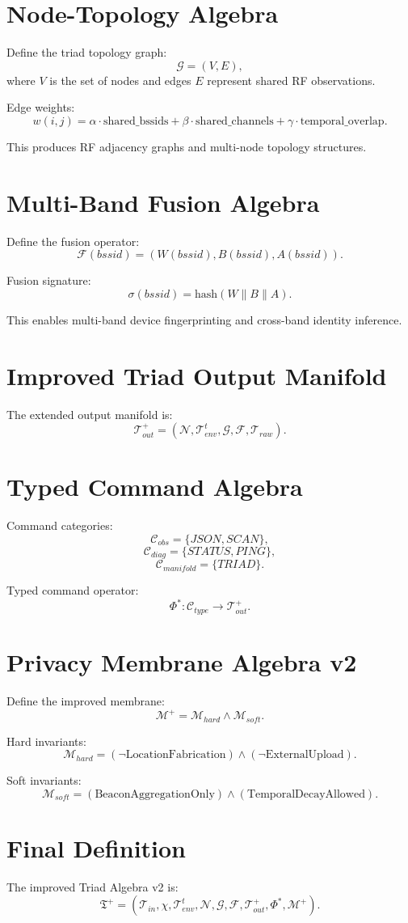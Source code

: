 \documentclass[11pt]{article}
\begin{document}
\section{Node-Topology Algebra}
Define the triad topology graph:
\[
\mathcal{G} = (V,E),
\]
where $V$ is the set of nodes and edges $E$ represent shared RF observations.

Edge weights:
\[
w(i,j)
= \alpha \cdot \text{shared\_bssids}
+ \beta \cdot \text{shared\_channels}
+ \gamma \cdot \text{temporal\_overlap}.
\]

This produces RF adjacency graphs and multi-node topology structures.

\section{Multi-Band Fusion Algebra}
Define the fusion operator:
\[
\mathcal{F}(bssid) = (W(bssid), B(bssid), A(bssid)).
\]

Fusion signature:
\[
\sigma(bssid) = \mathrm{hash}(W \parallel B \parallel A).
\]

This enables multi-band device fingerprinting and cross-band identity inference.

\section{Improved Triad Output Manifold}
The extended output manifold is:
\[
\mathcal{T}_{out}^{+}
= (\mathcal{N},\mathcal{T}_{env}^{t},\mathcal{G},\mathcal{F},\mathcal{T}_{raw}).
\]

\section{Typed Command Algebra}
Command categories:
\[
\mathcal{C}_{obs} = \{JSON, SCAN\},
\]
\[
\mathcal{C}_{diag} = \{STATUS, PING\},
\]
\[
\mathcal{C}_{manifold} = \{TRIAD\}.
\]

Typed command operator:
\[
\Phi^{\ast} : \mathcal{C}_{type} \to \mathcal{T}_{out}^{+}.
\]

\section{Privacy Membrane Algebra v2}
Define the improved membrane:
\[
\mathcal{M}^{+}
= \mathcal{M}_{hard} \land \mathcal{M}_{soft}.
\]

Hard invariants:
\[
\mathcal{M}_{hard}
= (\neg \text{LocationFabrication})
\land (\neg \text{ExternalUpload}).
\]

Soft invariants:
\[
\mathcal{M}_{soft}
= (\text{BeaconAggregationOnly})
\land (\text{TemporalDecayAllowed}).
\]

\section{Final Definition}
The improved Triad Algebra v2 is:
\[
\boxed{
\mathfrak{T}^{+} =
(\mathcal{T}_{in},\chi,\mathcal{T}_{env}^{t},\mathcal{N},\mathcal{G},
\mathcal{F},\mathcal{T}_{out}^{+},\Phi^{\ast},\mathcal{M}^{+})
}.
\]
\end{document}

